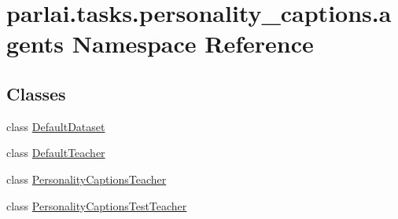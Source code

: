 \hypertarget{namespaceparlai_1_1tasks_1_1personality__captions_1_1agents}{}\section{parlai.\+tasks.\+personality\+\_\+captions.\+agents Namespace Reference}
\label{namespaceparlai_1_1tasks_1_1personality__captions_1_1agents}
\subsection*{Classes}
\begin{DoxyCompactItemize}
\item 
class \hyperlink{classparlai_1_1tasks_1_1personality__captions_1_1agents_1_1DefaultDataset}{Default\+Dataset}
\item 
class \hyperlink{classparlai_1_1tasks_1_1personality__captions_1_1agents_1_1DefaultTeacher}{Default\+Teacher}
\item 
class \hyperlink{classparlai_1_1tasks_1_1personality__captions_1_1agents_1_1PersonalityCaptionsTeacher}{Personality\+Captions\+Teacher}
\item 
class \hyperlink{classparlai_1_1tasks_1_1personality__captions_1_1agents_1_1PersonalityCaptionsTestTeacher}{Personality\+Captions\+Test\+Teacher}
\end{DoxyCompactItemize}

